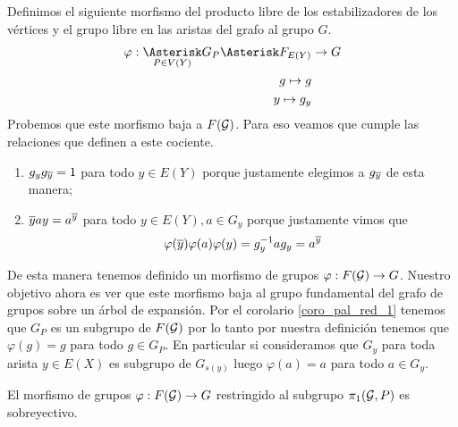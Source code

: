 \documentclass[tesis.tex]{subfiles}
\begin{document}
Definimos el siguiente morfismo del producto libre de los estabilizadores de los vértices y el grupo libre en las aristas del grafo al grupo $G$.
\begin{align*}
	\varphi: \underset{P \in V(Y)}{\Asterisk} G_P \Asterisk F_{E(Y)} &\to G	\\
	g \mapsto g \\
	y \mapsto g_y \\
\end{align*}
Probemos que este morfismo baja a $F({\cal G})$. 
Para eso veamos que cumple las relaciones que definen a este cociente.
\begin{enumerate}
	\item $g_y g_{\overline y} = 1$ para todo $y \in E(Y)$ porque justamente elegimos a $g_{\overline y}$ de esta manera;
	\item $\overline y a y = a^{\overline y}$ para todo $y \in E(Y), a \in G_y$ porque justamente vimos que 
	\[
		\varphi(\overline y) \varphi (a) \varphi(y) = g_y^{-1}ag_y = a^{\overline y}
	\]
\end{enumerate}

De esta manera tenemos definido un morfismo de grupos $\varphi: F({\cal G}) \to G$.
Nuestro objetivo ahora es ver que este morfismo baja al grupo fundamental del grafo de grupos sobre un árbol de expansión.
Por el corolario \ref{coro_pal_red_1} tenemos que $G_{P}$ es un subgrupo de $F({\cal G})$ por lo tanto por nuestra definición tenemos que $\varphi(g) = g$ para todo $g \in G_{P}$.
En particular si consideramos que $G_y$ para toda arista $y \in E(X)$ es subgrupo de $G_{s(y)}$ luego $\varphi(a) = a$ para todo $a \in G_{y}$.

\begin{prop}\label{prop_morf_grp_restr_sobre}
	El morfismo de grupos $\varphi: F({\cal G}) \to G$ restringido al subgrupo $\pi_1({\cal G}, P)$ es sobreyectivo.
\end{prop}
\end{document}

